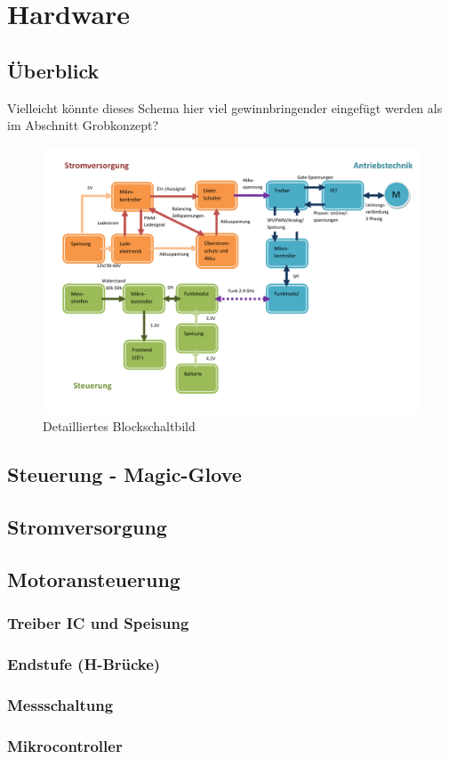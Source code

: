 \chapter{Hardware}
\label{Hardware}
\section{Überblick}

Vielleicht könnte dieses Schema hier viel gewinnbringender eingefügt werden als im Abschnitt Grobkonzept?

\begin{figure}[H]
	\centering
	\includegraphics[width=1\linewidth]{images/Grobkonzept_Blockschaltbild_detailliert}
	\caption[Detailliertes Blockschaltbild]{Detailliertes Blockschaltbild}
	\label{fig:grobkonzeptblockschaltbilddetailliert_2}
\end{figure}


\section{Steuerung - Magic-Glove}
\label{HW_MagicGlove}

\section{Stromversorgung}
\label{HW_Stromversorgung}

\section{Motoransteuerung}
\label{HW_Motoransteuerung}
\subsection*{Treiber IC und Speisung}
\subsection*{Endstufe (H-Brücke)}
\subsection*{Messschaltung}
\subsection*{Mikrocontroller}

